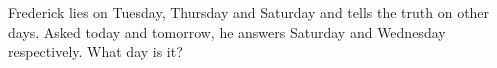Frederick lies on Tuesday, Thursday and Saturday and tells the truth on other days. Asked today and tomorrow, he answers Saturday and Wednesday respectively. What day is it?

